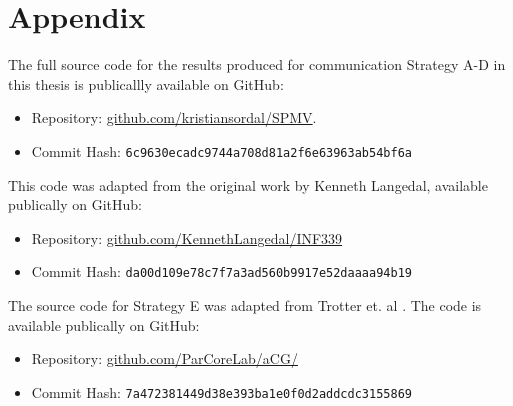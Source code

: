 \chapter{Appendix} \label{appendix}
The full source code for the results produced for communication Strategy A-D in this thesis is publicallly available on GitHub:
\begin{itemize}
    \item Repository: \href{https://github.com/kristiansordal/SPMV}{github.com/kristiansordal/SPMV}.  
    \item Commit Hash: \texttt{6c9630ecadc9744a708d81a2f6e63963ab54bf6a}
\end{itemize}

This code was adapted from the original work by Kenneth Langedal, available publically on GitHub:

\begin{itemize}
    \item Repository: \href{https://github.com/KennethLangedal/INF339}{github.com/KennethLangedal/INF339}
    \item Commit Hash: \texttt{da00d109e78c7f7a3ad560b9917e52daaaa94b19}
\end{itemize}

The source code for Strategy E was adapted from Trotter et. al \cite{trotter2025artifacts}. The code is available publically on GitHub:
\begin{itemize}
    \item Repository: \href{https://github.com/ParCoreLab/aCG/}{github.com/ParCoreLab/aCG/}
    \item Commit Hash: \texttt{7a472381449d38e393ba1e0f0d2addcdc3155869}
\end{itemize}
